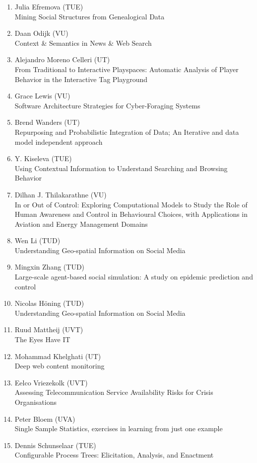 \begin{multicols}{2}
\begin{scriptsize}
\begin{enumerate}[label=\textbf{2016-\arabic*},leftmargin=0cm,itemindent=1.15cm,labelwidth=\itemindent,labelsep=0cm,align=left,noitemsep]
\item Julia Efremova (TUE)    \\
	Mining Social Structures from Genealogical Data

\item Daan Odijk (VU)   \\
	Context \& Semantics in News \& Web Search 
	
\item Alejandro Moreno Celleri (UT)   \\
	From Traditional to Interactive Playspaces: Automatic Analysis of Player Behavior in the Interactive Tag Playground
	
\item Grace Lewis (VU)   \\
	Software Architecture Strategies for Cyber-Foraging Systems 
	
\item Brend Wanders (UT)    \\
	Repurposing and Probabilistic Integration of Data; An Iterative and data model independent approach 

\item Y. Kiseleva (TUE)    \\
	Using Contextual Information to Understand Searching and Browsing Behavior
	
\item Dilhan J. Thilakarathne (VU)   \\
	In or Out of Control: Exploring Computational Models to Study the Role of Human Awareness and Control in Behavioural Choices, with Applications in Aviation and Energy Management Domains
\item Wen Li (TUD)    \\
	Understanding Geo-spatial Information on Social Media
\item Mingxin Zhang (TUD)   \\
	Large-scale agent-based social simulation: A study on epidemic prediction and control
\item Nicolas Höning (TUD)   \\
	Understanding Geo-spatial Information on Social Media
	
\item Ruud Mattheij (UVT)   \\
	The Eyes Have IT
\item Mohammad Khelghati (UT)   \\
	Deep web content monitoring
\item Eelco Vriezekolk (UVT)   \\
	Assessing Telecommunication Service Availability Risks for Crisis Organisations
\item Peter Bloem (UVA)   \\
	Single Sample Statistics, exercises in learning from just one example 
\item Dennis Schunselaar (TUE)   \\
	Configurable Process Trees: Elicitation, Analysis, and Enactment
	

\end{enumerate}
\end{scriptsize}
\end{multicols}
